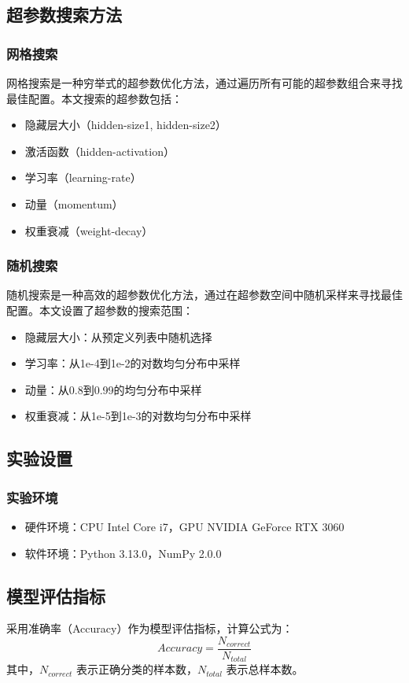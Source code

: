 \documentclass[UTF8]{article}
\begin{document}
\subsection{超参数搜索方法}
\subsubsection{网格搜索}
网格搜索是一种穷举式的超参数优化方法，通过遍历所有可能的超参数组合来寻找最佳配置。本文搜索的超参数包括：
\begin{itemize}[topsep=0pt, partopsep=0pt, itemsep=0pt, parsep=0pt]
    \item 隐藏层大小（hidden-size1, hidden-size2）
    \item 激活函数（hidden-activation）
    \item 学习率（learning-rate）
    \item 动量（momentum）
    \item 权重衰减（weight-decay）
\end{itemize}
\subsubsection{随机搜索}
随机搜索是一种高效的超参数优化方法，通过在超参数空间中随机采样来寻找最佳配置。本文设置了超参数的搜索范围：
\begin{itemize}[topsep=0pt, partopsep=0pt, itemsep=0pt, parsep=0pt]
    \item 隐藏层大小：从预定义列表中随机选择
    \item 学习率：从1e-4到1e-2的对数均匀分布中采样
    \item 动量：从0.8到0.99的均匀分布中采样
    \item 权重衰减：从1e-5到1e-3的对数均匀分布中采样
\end{itemize}
\subsection{实验设置}
\subsubsection{实验环境}
\begin{itemize}[topsep=0pt, partopsep=0pt, itemsep=0pt, parsep=0pt]
    \item 硬件环境：CPU Intel Core i7，GPU NVIDIA GeForce RTX 3060
    \item 软件环境：Python 3.13.0，NumPy 2.0.0
\end{itemize}
\subsection{模型评估指标}
采用准确率（Accuracy）作为模型评估指标，计算公式为：
$$Accuracy = \frac{N_{correct}}{N_{total}}$$
其中，$N_{correct}$ 表示正确分类的样本数，$N_{total}$ 表示总样本数。
\end{document}
